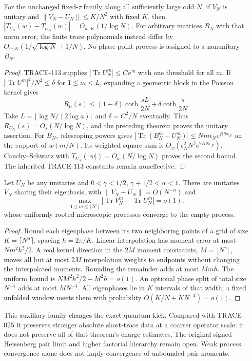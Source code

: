 \begin{theorem}
\label{thm:original-pair-transfer}
For the unchanged fixed-$\tau$ family along all sufficiently large odd $N$,
if $V_N$ is unitary and $\|V_N-U_N\|\le K/N^2$ with fixed $K$, then
$|T_{V_N}(w)-T_{U_N}(w)|=O_{w,K}(1/\log N)$.
For arbitrary matrices $B_N$ with that norm error, the finite trace polynomials
instead differ by $O_{w,K}(1/\sqrt{\log N}+1/N)$.
No phase point process is assigned to a nonunitary $B_N$.
\end{theorem}
\begin{proof}
TRACE-113 supplies $|\operatorname{Tr}U_N^m|\le Ca^m$ with one threshold
for all $m$. If $|\operatorname{Tr}U^m|^2/N^2\le\delta$ for $1\le m<L$,
expanding a geometric block in the Poisson kernel gives
\[
 R_U(s)\le(1-\delta)\coth\frac{sL}{2N}+\delta\coth\frac{s}{2N}.
\]
Take $L=\lfloor\log N/(2\log a)\rfloor$ and $\delta=C^2/N$ eventually.
Thus $R_{U_N}(s)=O_s(N/\log N)$, and the preceding theorem proves the
unitary assertion. For $B_N$, telescoping powers gives
$|\operatorname{Tr}(B_N^m-U_N^m)|\le Nm\epsilon_N e^{RN\epsilon_N}$
on the support of $w(m/N)$. Its weighted square sum is
$O_w(\epsilon_N^2N^3e^{2RN\epsilon_N})$.
Cauchy--Schwarz with $T_{U_N}(|w|)=O_w(N/\log N)$ proves the second bound.
The inherited TRACE-113 constants remain noneffective.
\end{proof}

\begin{theorem}
\label{thm:balanced-spectral-rounding}
Let $U_N$ be any unitaries and $0<\gamma<1/2$, $\gamma+1/2<\alpha<1$.
There are unitaries $V_N$ sharing their eigenbasis, with
$\|V_N-U_N\|=O(N^{-\alpha})$ and
\[
 \max_{1\le m\le\lfloor N^\gamma\rfloor}
 |\operatorname{Tr}V_N^m-\operatorname{Tr}U_N^m|=o(1),
\]
whose uniformly rooted microscopic processes converge to the empty process.
\end{theorem}
\begin{proof}
Round each eigenphase between its two neighboring points of a grid of size
$K=\lceil N^\alpha\rceil$, spacing $h=2\pi/K$.
Linear interpolation has moment error at most $Nm^2h^2/2$.
A real kernel direction in the $2M$ moment constraints, $M=\lfloor N^\gamma\rfloor$,
moves all but at most $2M$ interpolation weights to endpoints without changing
the interpolated moments. Rounding the remainder adds at most $Mmh$.
The uniform bound is $NM^2h^2/2+M^2h=o(1)$.
An optional phase split of total size $N^{-4}$ adds at most $MN^{-4}$.
All eigenphases lie in $K$ intervals of that width; a fixed unfolded window
meets them with probability $O(K/N+KN^{-4})=o(1)$.
\end{proof}
This auxiliary family changes the exact quantum kick. Compared with TRACE-025
it preserves stronger absolute short-trace data at a coarser operator scale;
it does not preserve all of that theorem's charge estimates.
The original signed Heisenberg pair limit and higher factorial hierarchy remain
open. Weak process convergence alone does not imply convergence of unbounded
pair moments.
